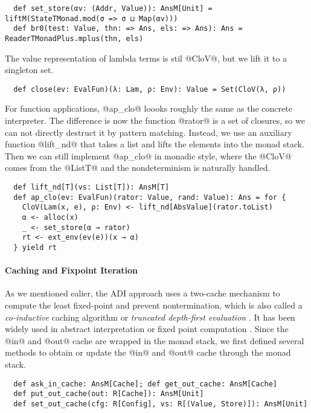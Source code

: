 \begin{lstlisting}
  def set_store(αv: (Addr, Value)): AnsM[Unit] = liftM(StateTMonad.mod(σ => σ ⊔ Map(αv)))
  def br0(test: Value, thn: => Ans, els: => Ans): Ans = ReaderTMonadPlus.mplus(thn, els)
\end{lstlisting}

The value representation of lambda terms is stil @CloV@, but we lift it to a
singleton set.

\begin{lstlisting}
  def close(ev: EvalFun)(λ: Lam, ρ: Env): Value = Set(CloV(λ, ρ))
\end{lstlisting}

For function applications, @ap_clo@ loooks roughly the same as the concrete
interpreter. The difference is now the function @rator@ is a set of closures, so
we can not directly destruct it by pattern matching. Instead, we use an
auxiliary function @lift_nd@ that takes a list and lifts the elements into the
monad stack. Then we can still implement @ap_clo@ in monadic style, where the
@CloV@ comes from the @ListT@ and the nondeterminism is naturally handled.

\begin{lstlisting}
  def lift_nd[T](vs: List[T]): AnsM[T]
  def ap_clo(ev: EvalFun)(rator: Value, rand: Value): Ans = for {
    CloV(Lam(x, e), ρ: Env) <- lift_nd[AbsValue](rator.toList)
    α <- alloc(x)
    _ <- set_store(α → rator)
    rt <- ext_env(ev(e))(x → α)
  } yield rt
\end{lstlisting}


\paragraph{Caching and Fixpoint Iteration}

As we mentioned ealier, the ADI approach uses a two-cache mechanism to
compute the least fixed-point and prevent nontermination, which is also called a
\textit{co-inductive} caching algorithm or \textit{truncated depth-first
evaluation} \cite{Rosendahl:AbsIntPL}. It has been widely used in abstract
interpretation or fixed point computation
\cite{DBLP:journals/pacmpl/DaraisLNH17, Wei:2018:RAA:3243631.3236800,
Rosendahl:AbsIntPL}. Since the @in@ and @out@ cache are wrapped in the monad
stack, we first defined several methods to obtain or update the @in@ and @out@
cache through the monad stack.

\begin{lstlisting}
  def ask_in_cache: AnsM[Cache]; def get_out_cache: AnsM[Cache]
  def put_out_cache(out: R[Cache]): AnsM[Unit]
  def set_out_cache(cfg: R[Config], vs: R[(Value, Store)]): AnsM[Unit]
\end{lstlisting}

